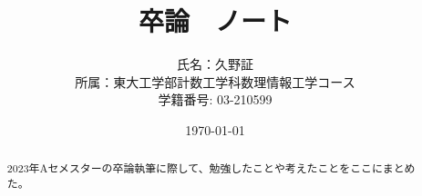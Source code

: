 \documentclass{ltjsarticle}
\title{卒論　ノート}
\author{氏名：久野証\\所属：東大工学部計数工学科数理情報工学コース\\学籍番号: 03-210599}
\date{\today}
\begin{document}
  \maketitle
  \tableofcontents
  \begin{abstract}
    2023年Aセメスターの卒論執筆に際して、勉強したことや考えたことをここにまとめた。
  \end{abstract}
  \clearpage

  
  
  
  
  
\end{document}
